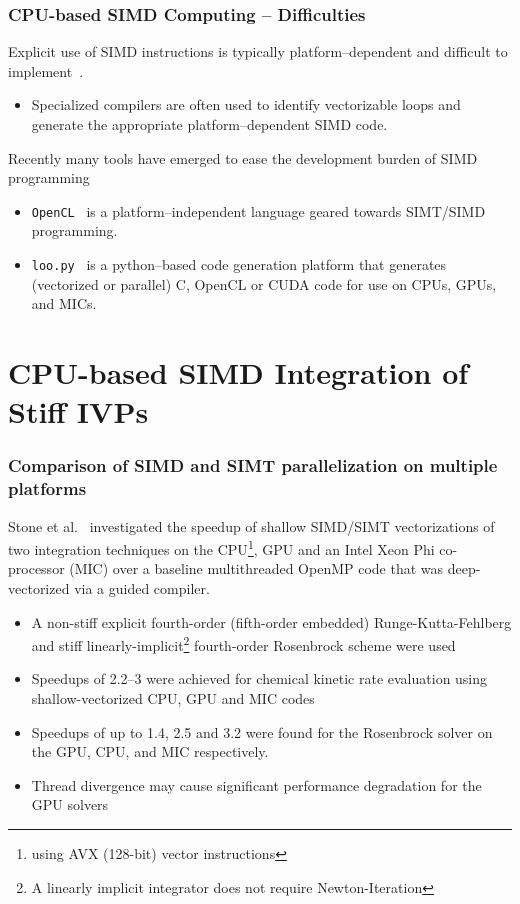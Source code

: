 \documentclass{beamer}
\newcounter{stiff}
\begin{document}
\begin{frame}
  \frametitle{CPU-based SIMD Computing -- Difficulties}
  Explicit use of SIMD instructions is typically platform--dependent and difficult to implement~.
  \begin{itemize}
   \item Specialized compilers are often used to identify vectorizable loops and generate the appropriate platform--dependent SIMD code.
  \end{itemize}
  Recently many tools have emerged to ease the development burden of SIMD programming
  \begin{itemize}
   \item \texttt{OpenCL}~ is a platform--independent language geared towards SIMT\slash SIMD programming.
   \item \texttt{loo.py}~ is a python--based code generation platform that generates (vectorized or parallel) C, OpenCL or CUDA code for use on CPUs, GPUs, and MICs.
  \end{itemize}
\end{frame}

\section{CPU-based SIMD Integration of Stiff IVPs}

\begin{frame}[allowframebreaks]
 \frametitle{Comparison of SIMD and SIMT parallelization on multiple platforms}
 Stone et al.~ investigated the speedup of shallow SIMD\slash SIMT vectorizations of two integration techniques on the CPU\footnote{using AVX (128-bit) vector instructions}, GPU and an Intel Xeon Phi co-processor (MIC) over a baseline multithreaded OpenMP code that was deep-vectorized via a guided compiler.
 \begin{itemize}
  \item A non-stiff explicit fourth-order (fifth-order embedded) Runge-Kutta-Fehlberg and stiff linearly-implicit\footnote{A linearly implicit integrator does not require Newton-Iteration} fourth-order Rosenbrock scheme were used
  \item Speedups of \SIrange{2.2}{3}{\times} were achieved for chemical kinetic rate evaluation using shallow-vectorized CPU, GPU and MIC codes
  \item Speedups of up to \SI{1.4}{\times}, \SI{2.5}{\times} and \SI{3.2}{\times} were found for the Rosenbrock solver on the GPU, CPU, and MIC respectively.
  \item Thread divergence may cause significant performance degradation for the GPU solvers
 \end{itemize}
\end{frame}
\end{document}

